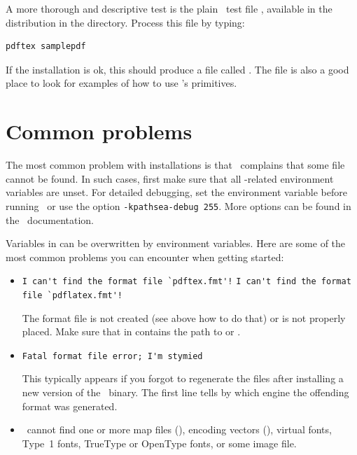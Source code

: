 \documentclass{pdftexmanual}
\begin{document}
{A more thorough and descriptive test is the plain \TEX\ test file
, available in the distribution in the
 directory. Process this file by typing:

\begin{verbatim}
pdftex samplepdf
\end{verbatim}

If the installation is ok, this should produce a file called
. The file  is also a
good place to look for examples of how to use \PDFTEX's primitives.

\section{Common problems}

The most common problem with installations is that \PDFTEX\ complains
that some file cannot be found. In such cases, first make sure that all
\TEX-related environment variables are unset. For detailed debugging,
set the environment variable  before running
\PDFTEX\ or use the option \verb|-kpathsea-debug 255|. More options can
be found in the \WEBC\ documentation.

Variables in  can be overwritten by environment
variables. Here are some of the most common problems you can encounter
when getting started:

\begin{itemize}
\item  \verb|I can't find the format file `pdftex.fmt'!| \newline
       \verb|I can't find the format file `pdflatex.fmt'!|

       The format file is not created (see above how to do that) or
       is not properly placed. Make sure that  in
        contains the path to 
       or .

\item \verb|Fatal format file error; I'm stymied|

       This typically appears if you forgot to regenerate the 
       files after installing a new version of the \PDFTEX\ binary.
       The first line tells by which engine the offending format was generated.

\item  \PDFTEX\ cannot find one or more map files (),
       encoding vectors (), virtual fonts, Type~1 fonts,
       TrueType or OpenType fonts, or some image file.


\end{itemize}}
\end{document}
